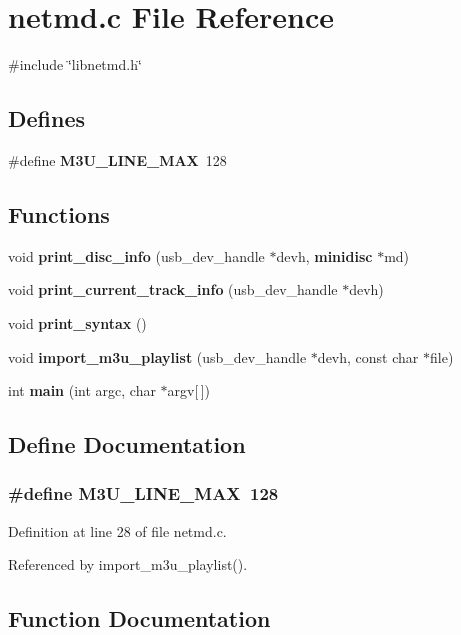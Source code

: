 \section{netmd.c File Reference}
\label{netmd_8c}
{\ttfamily \#include \char`\"{}libnetmd.h\char`\"{}}\par
\subsection*{Defines}
\begin{DoxyCompactItemize}
\item 
\#define {\bf M3U\_\-LINE\_\-MAX}~128
\end{DoxyCompactItemize}
\subsection*{Functions}
\begin{DoxyCompactItemize}
\item 
void {\bf print\_\-disc\_\-info} (usb\_\-dev\_\-handle $\ast$devh, {\bf minidisc} $\ast$md)
\item 
void {\bf print\_\-current\_\-track\_\-info} (usb\_\-dev\_\-handle $\ast$devh)
\item 
void {\bf print\_\-syntax} ()
\item 
void {\bf import\_\-m3u\_\-playlist} (usb\_\-dev\_\-handle $\ast$devh, const char $\ast$file)
\item 
int {\bf main} (int argc, char $\ast$argv[$\,$])
\end{DoxyCompactItemize}


\subsection{Define Documentation}
\subsubsection[{M3U\_\-LINE\_\-MAX}]{\setlength{\rightskip}{0pt plus 5cm}\#define M3U\_\-LINE\_\-MAX~128}\label{netmd_8c_a0299403f98b1f464954cb16ea5182fb6}


Definition at line 28 of file netmd.c.

Referenced by import\_\-m3u\_\-playlist().

\subsection{Function Documentation}
